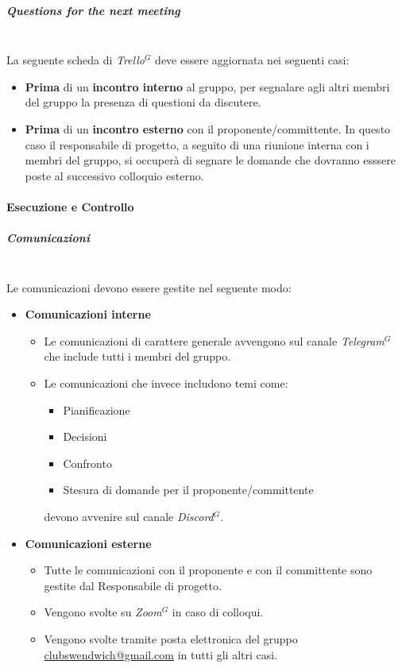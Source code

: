 \subparagraph{Questions for the next meeting}
\mbox{}\\
La seguente scheda di \textit{Trello}$^G$ deve essere aggiornata nei seguenti casi:
\begin{itemize}
    \item \textbf{Prima} di un \textbf{incontro interno} al gruppo, per segnalare agli altri membri del gruppo
    la presenza di questioni da discutere.
    \item \textbf{Prima} di un \textbf{incontro esterno} con il proponente/committente. In questo caso il responsabile
    di progetto, a seguito di una riunione interna con i membri del gruppo, si occuperà di segnare le
    domande che dovranno esssere poste al successivo colloquio esterno.
\end{itemize}

\newpage
\paragraph{Esecuzione e Controllo}

\subparagraph{Comunicazioni}
\mbox{}\\

Le comunicazioni devono essere gestite nel seguente modo:
\begin{itemize}
    \item \textbf{Comunicazioni interne}
    \begin{itemize}
        \item Le comunicazioni di carattere generale avvengono sul canale \textit{Telegram}$^{G}$
        che include tutti i membri del gruppo.
        \item Le comunicazioni che invece includono temi come:
        \begin{itemize}
            \item Pianificazione
            \item Decisioni
            \item Confronto
            \item Stesura di domande per il proponente/committente
        \end{itemize}
        devono avvenire sul canale \textit{Discord}$^{G}$.
    \end{itemize}
    \item \textbf{Comunicazioni esterne}
    \begin{itemize}
        \item Tutte le comunicazioni con il proponente e con il committente sono gestite dal Responsabile di progetto.
        \item Vengono svolte su \textit{Zoom}$^{G}$ in caso di colloqui.
        \item Vengono svolte tramite posta elettronica del gruppo \href{mailto:clubswendwich@gmail.com}{clubswendwich@gmail.com} in tutti gli altri casi.
    \end{itemize}
\end{itemize}

